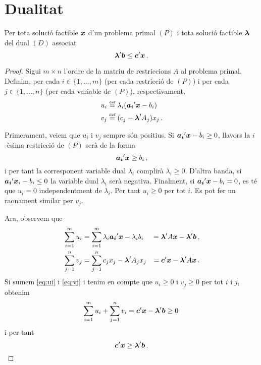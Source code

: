 \section{Dualitat}


\begin{teo}\label{teo:dualitat-feble}
    Per tota solució factible $\boldsymbol{x}$ d'un problema primal $\left(P\right)$ i tota solució factible $\boldsymbol{\lambda}$ del dual $\left(D\right)$ associat
    \[ \boldsymbol{\lambda}'\boldsymbol{b}\leq \boldsymbol{c}'\boldsymbol{x}\,. \]
    \begin{proof}
    	Sigui $m\times n$ l'ordre de la matriu de restriccions $A$ al problema primal. Definim, per cada $i\in\{1,\ldots,m\}$ (per cada restricció de $(P)$) i per cada $j\in\{1,\ldots,n\}$ (per cada variable de $(P)$), respectivament, 
    	\begin{align*}
    		u_i &\stackrel{\text{\tiny def}}{=} {{\lambda}}_i(\boldsymbol{\boldsymbol{a_i}}'\boldsymbol{\boldsymbol{x}}-b_i)\\
    		v_j &\stackrel{\text{\tiny def}}{=} (c_j - \boldsymbol{\boldsymbol{\lambda}}'A_j)x_j\,.
    	\end{align*}
    	
    	Primerament, veiem que $u_i$ i $v_j$ sempre són positius. Si $\boldsymbol{\boldsymbol{a_i}}'\boldsymbol{\boldsymbol{x}}-b_i \ge 0$, llavors la $i$-èsima restricció de $(P)$ serà de la forma \[\boldsymbol{\boldsymbol{a_i}}'\boldsymbol{\boldsymbol{x}} \ge b_i\,,\] i per tant la corresponent variable dual $\lambda_i$ complirà $\lambda_i \ge 0$. D'altra banda, si $\boldsymbol{\boldsymbol{a_i}}'\boldsymbol{\boldsymbol{x}}_i-b_i \le 0$ la variable dual $\lambda_i$ serà negativa. Finalment, si $\boldsymbol{\boldsymbol{a_i}}'\boldsymbol{\boldsymbol{x}}-b_i = 0$, es té que $u_i = 0$ independentment de $\lambda_i$. Per tant $u_i \ge 0$ per tot $i$. Es pot fer un raonament similar per $v_j$.
    	
    	Ara, observem que
    	\begin{alignat}{2}{}
    		\sum_{i = 1}^{m} u_i &= \sum_{i = 1}^{m} \lambda_i\boldsymbol{\boldsymbol{a_i}}'\boldsymbol{\boldsymbol{x}}-\lambda_ib_i &= \boldsymbol{\boldsymbol{\lambda}}'A\boldsymbol{\boldsymbol{x}} - \boldsymbol{\boldsymbol{\lambda}}'\boldsymbol{b}\,, \label{eq:ui}\\
    		\sum_{j = 1}^{n} v_j &= \sum_{j = 1}^{n} c_jx_j - \boldsymbol{\boldsymbol{\lambda}}'A_jx_j &= \boldsymbol{\boldsymbol{c}}'\boldsymbol{\boldsymbol{x}} - \boldsymbol{\boldsymbol{\lambda}}'A\boldsymbol{\boldsymbol{x}}\,. \label{eq:vj}
    	\end{alignat}
    	Si sumem \eqref{eq:ui} i \eqref{eq:vj} i tenim en compte que $u_i \ge 0$ i $v_j \ge 0$ per tot $i$ i $j$, obtenim
    	\begin{equation}\label{eq:sum-ui-vj}
    		\sum_{i = 1}^{m} u_i + \sum_{j = 1}^{n} v_i= \boldsymbol{\boldsymbol{c}}'\boldsymbol{\boldsymbol{x}}-\boldsymbol{\boldsymbol{\lambda}}'\boldsymbol{b} \ge 0\,
    	\end{equation}
    	i per tant \[\boldsymbol{\boldsymbol{c}}'\boldsymbol{\boldsymbol{x}} \ge \boldsymbol{\boldsymbol{\lambda}}'\boldsymbol{b}\,.\]
    \end{proof}
\end{teo}
